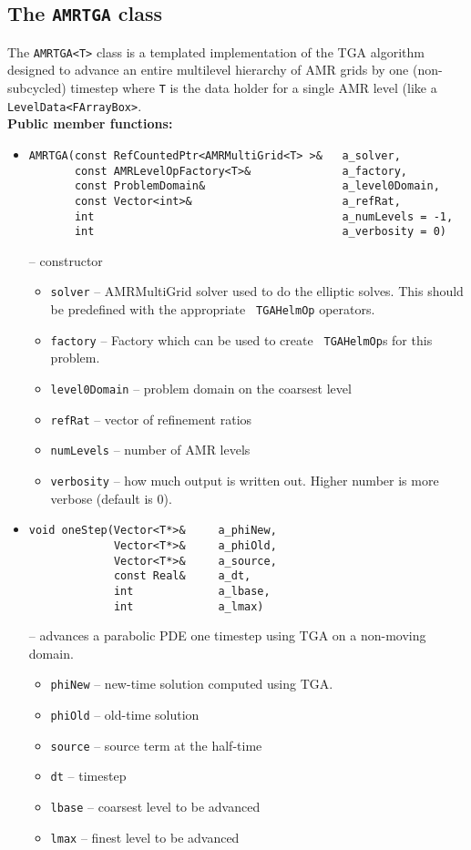 \subsection{The {\tt AMRTGA} class}
The {\tt AMRTGA<T>} class is a templated implementation of the TGA
algorithm designed to advance an entire multilevel hierarchy of AMR grids by
one (non-subcycled) timestep where {\tt T} is the data holder for a
single AMR level (like a {\tt   LevelData<FArrayBox>}. \\
{\bf Public member functions:}
\begin{itemize}

\item
\begin{verbatim}
AMRTGA(const RefCountedPtr<AMRMultiGrid<T> >&   a_solver,
       const AMRLevelOpFactory<T>&              a_factory,
       const ProblemDomain&                     a_level0Domain,
       const Vector<int>&                       a_refRat,
       int                                      a_numLevels = -1,
       int                                      a_verbosity = 0)
\end{verbatim}
-- constructor
\begin{itemize}
\item {\tt solver} -- AMRMultiGrid solver used to do the elliptic
  solves. This should be predefined with the appropriate {\tt
    TGAHelmOp} operators.
\item {\tt factory} -- Factory which can be used to create {\tt
    TGAHelmOp}s for this problem.
\item {\tt level0Domain} -- problem domain on the coarsest level
\item {\tt refRat} -- vector of refinement ratios
\item {\tt numLevels} -- number of AMR levels 
\item {\tt verbosity} -- how much output is written out. Higher number
  is more verbose (default is 0).
\end{itemize}

\item
\begin{verbatim}
void oneStep(Vector<T*>&     a_phiNew,
             Vector<T*>&     a_phiOld,
             Vector<T*>&     a_source,
             const Real&     a_dt,
             int             a_lbase,
             int             a_lmax)
\end{verbatim}
-- advances a parabolic PDE one timestep using TGA on a non-moving domain.
\begin{itemize}
\item {\tt phiNew} -- new-time solution computed using TGA.
\item {\tt phiOld} -- old-time solution
\item {\tt source} -- source term at the half-time
\item {\tt dt}     -- timestep
\item {\tt lbase}  -- coarsest level to be advanced
\item {\tt lmax} -- finest level to be advanced
\end{itemize}

\end{itemize}
 
